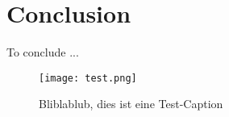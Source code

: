 \section{Conclusion}
\label{sec:Conclusion}

To conclude  ... \cite{image-to-image-can}
\\

\begin{figure}[h]
\centering
\texttt{[image: test.png]}
\caption{Bliblablub, dies ist eine Test-Caption}
\end{figure}
